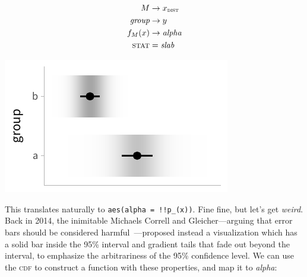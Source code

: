 \documentclass[journal]{vgtc}                     %
\begin{document}
\noindent
\begin{minipage}{.5\columnwidth}

\begin{align*}
M &\rightarrow x_\textsc{dist}\\
\textit{group} &\rightarrow y\\
f_M(x) &\rightarrow \textit{alpha}\\
\textsc{stat} &= \mathit{slab}
\end{align*}
\end{minipage}%
  \begin{minipage}{.4\columnwidth}
    \centering
    \includegraphics[width=1.2\columnwidth]{figs/3-slab_gradient_two_groups.pdf}
  \end{minipage}
\hfill\break

This translates naturally to \texttt{aes(alpha = !!p\_(x))}. Fine fine, but let's get \textit{weird}. Back in 2014, the inimitable Michaels Correll and Gleicher---arguing that error bars should be considered harmful~\cite{correll2014error}---proposed instead a visualization which has a solid bar inside the 95\% interval and gradient tails that fade out beyond the interval, to emphasize the arbitrariness of the 95\% confidence level. We can use the \textsc{cdf} to construct a function with these properties, and map it to \textit{alpha}:
\end{document}
